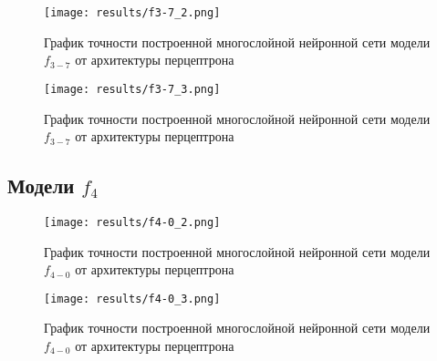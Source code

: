 

\bigskip

\begin{figure}[H]
	\texttt{[image: results/f3-7\_2.png]}
	
	\caption{График точности построенной многослойной нейронной сети модели $f_{3-7}$ от архитектуры перцептрона}
	
\end{figure}


\begin{figure}[H]
	\texttt{[image: results/f3-7\_3.png]}
	
	\caption{График точности построенной многослойной нейронной сети модели $f_{3-7}$ от архитектуры перцептрона}	
\end{figure}

  
\subsection{Модели $f_{4}$}

\begin{figure}[H]
	\texttt{[image: results/f4-0\_2.png]}
	
	\caption{График точности построенной многослойной нейронной сети модели $f_{4-0}$ от архитектуры перцептрона}
	
\end{figure}


\begin{figure}[H]
	\texttt{[image: results/f4-0\_3.png]}
	
	\caption{График точности построенной многослойной нейронной сети модели $f_{4-0}$ от архитектуры перцептрона}	
\end{figure}


